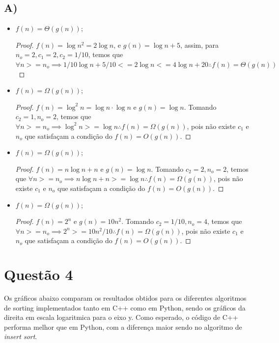 \documentclass{article}
\begin{document}
\subsection*{A)}
\begin{itemize}
  \item $f(n) = \Theta(g(n))$;
  \begin{proof}
  $f(n) = \log{n^2} = 2\log{n}$, e $g(n) = \log{n} +5$, assim, para $n_o=2,c_1 = 2,c_2=1/10$, temos que
  $\forall n>=n_o \implies 1/10\log{n}+5/10 <= 2\log{n} <= 4\log{n} + 20 \therefore f(n) = \Theta(g(n))$
  \end{proof}

  \item
  $f(n) = \Omega(g(n))$;
  \begin{proof}
  $f(n) = \log^2{n} = \log{n}\cdot\log{n}$ e $g(n) = \log{n}$. Tomando $c_2=1,n_o = 2$, temos que
  $\forall n >= n_o \implies \log^2{n} >= \log{n} \therefore f(n) = \Omega(g(n))$, pois não existe $c_1$ e $n_o$
  que satisfaçam a condição do $f(n) = O(g(n))$.
  \end{proof}

  \item
  $f(n) = \Omega(g(n))$;
  \begin{proof}
  $f(n) = n\log{n} + n$ e $g(n) = \log{n}$. Tomando $c_2=2,n_o = 2$, temos que
  $\forall n >= n_o \implies n\log{n} + n >= \log{n} \therefore f(n) = \Omega(g(n))$, pois não existe $c_1$ e $n_o$
  que satisfaçam a condição do $f(n) = O(g(n))$.
  \end{proof}

  \item
  $f(n) = \Omega(g(n))$;
  \begin{proof}
  $f(n) = 2^n$ e $g(n) =10n^2$. Tomando $c_2=1/10,n_o = 4$, temos que
  $\forall n >= n_o \implies 2^n >= 10n^2/10 \therefore f(n) = \Omega(g(n))$, pois não existe $c_1$ e $n_o$
  que satisfaçam a condição do $f(n) = O(g(n))$.
  \end{proof}


\end{itemize}

\section*{Questão 4}

Os gráficos abaixo comparam os resultados obtidos para os diferentes algoritmos de sorting
implementados tanto em C++ como em Python, sendo os gráficos da direita em escala logaritmica para o eixo y.
Como esperado, o código de C++ performa melhor
que em Python, com a diferença maior sendo no algoritmo de {\it insert sort}.
\end{document}
